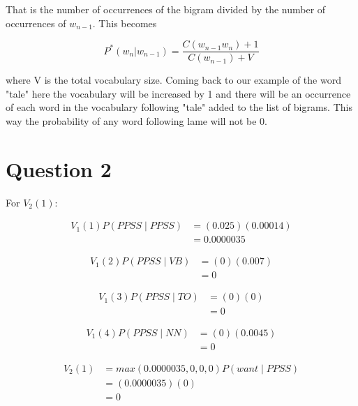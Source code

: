 \documentclass[10pt,a4paper]{article}
\begin{document}
That is the number of occurrences of the bigram divided by the number of occurrences of $w_{n-1}$. This becomes

\begin{equation}
P^*(w_n|w_{n-1}) = \frac{C(w_{n-1}w_n)+1}{C(w_{n-1})+V}
\end{equation}

where V is the total vocabulary size. Coming back to our example of the word "tale" here the vocabulary will be increased by 1 and there will be an occurrence of each word in the vocabulary following "tale" added to the list of bigrams. This way the probability of any word following lame will not be 0.
 
\section{Question 2}
For $V_2(1):$

\begin{equation}
\begin{split}
V_1(1)P(PPSS\mid PPSS) &= (0.025)(0.00014) \\
&= 0.0000035
\end{split}
\end{equation}

\begin{equation}
\begin{split}
V_1(2)P(PPSS\mid VB) &= (0)(0.007) \\
 &= 0
\end{split}
\end{equation}

\begin{equation}
\begin{split}
V_1(3)P(PPSS\mid TO) &= (0)(0) \\
&= 0
\end{split}
\end{equation}

\begin{equation}
\begin{split}
V_1(4)P(PPSS\mid NN) &= (0)(0.0045) \\
 &= 0
\end{split}
\end{equation}

\begin{equation}
\begin{split}
V_2(1) &= max(0.0000035,0,0,0)P(want\mid PPSS) \\
 &=(0.0000035)(0) \\
 &=0
\end{split}
\end{equation}
\end{document}
